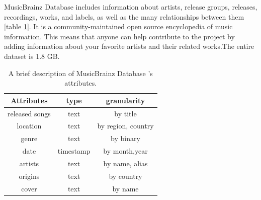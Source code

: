 \documentclass[12pt]{article}
\begin{document}
MusicBrainz Database\cite{musicbrainz} includes information about artists, release groups, releases, recordings,
works, and labels, as well as the many relationships between them [table \ref{table:1}].
It is a community-maintained open source encyclopedia of music information. This means that anyone can help contribute to the project by adding information about your favorite artists and their related works.The entire dataset is 1.8 GB.
\begin{table}[h!]
\begin{center}
 \begin{tabular}{||c c c ||} 
 \hline
 Attributes & type & granularity \\ [0.5ex] 
 \hline\hline
 released songs & text & by title \\ 
 \hline
 location & text & by region, country  \\
 \hline
 genre & text & by binary  \\
 \hline
 date & timestamp & by month,year  \\
 \hline
 artists & text & by name, alias  \\
 \hline
 origins & text & by country  \\
 \hline
 cover & text & by name  \\
 \hline
\end{tabular}
\caption{A brief description of MusicBrainz Database 's attributes.}
\label{table:1}
\end{center}
\end{table}

\end{document}
